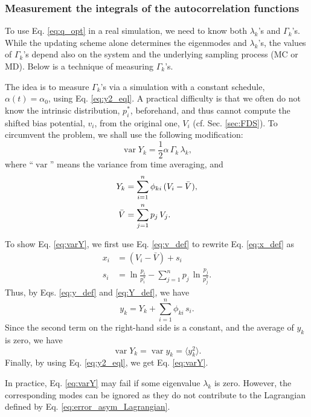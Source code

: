 \documentclass[reprint, floatfix]{revtex4-1}
\begin{document}
\subsubsection{\label{sec:measure_gamma}
Measurement the integrals
of the autocorrelation functions}



To use Eq. \eqref{eq:q_opt} in a real simulation,
we need to know both $\lambda_k$'s and $\Gamma_k$'s.
%
While the updating scheme alone
determines the eigenmodes and $\lambda_k$'s,
the values of $\Gamma_k$'s depend also on the system
and the underlying sampling process (MC or MD).
%
Below is a technique of measuring $\Gamma_k$'s.

The idea is to measure $\Gamma_k$'s
via a simulation with a constant schedule,
$\alpha(t) = \alpha_0$,
using Eq. \eqref{eq:y2_eql}.
%
A practical difficulty is that
we often do not know the intrinsic distribution, $p^*_i$,
beforehand, and thus cannot compute
the shifted bias potential, $v_i$,
from the original one, $V_i$
(cf. Sec. \ref{sec:FDS}).
%
To circumvent the problem, we shall use
the following modification:
%
\begin{equation}
  \operatorname{var} Y_k
  =
  \frac{1}{2}
  \alpha \, \Gamma_k \, \lambda_k,
\label{eq:varY}
\end{equation}
%
where
``$\operatorname{var}$''
means the variance from time averaging,
and
%
\begin{align}
Y_k
&=
\sum_{ i = 1 }^n
  \phi_{k i} \, (V_i - \bar V),
\label{eq:Y_def}
\\
\bar V
&=
\sum_{ j = 1 }^n p_j \, V_j.
\notag
\end{align}

To show Eq. \eqref{eq:varY},
we first use Eq. \eqref{eq:v_def}
to rewrite Eq. \eqref{eq:x_def}
as
$$
\begin{aligned}
x_i
&=
(V_i - \bar V) + s_i
\\
s_i
&=
\ln \frac{ p_i } { p^*_i }
-
\sum_{ j = 1 }^n
  p_j \, \ln \frac{ p_j } { p^*_j }.
\end{aligned}
$$
Thus, by Eqs. \eqref{eq:y_def} and \eqref{eq:Y_def},
we have
$$
y_k = Y_k + \sum_{i = 1}^n \phi_{k i} \, s_i.
$$
Since the second term on the right-hand side
is a constant, and the average of $y_k$ is zero,
we have
$$
\operatorname{var} Y_k
=
\operatorname{var} y_k
=
\langle y_k^2 \rangle.
$$
Finally, by using Eq. \eqref{eq:y2_eql},
we get Eq. \eqref{eq:varY}.

In practice, Eq. \eqref{eq:varY}
may fail if some eigenvalue $\lambda_k$ is zero.
%
However, the corresponding modes can be ignored
as they do not contribute to the Lagrangian defined by
Eq. \eqref{eq:error_asym_Lagrangian}.
\end{document}
